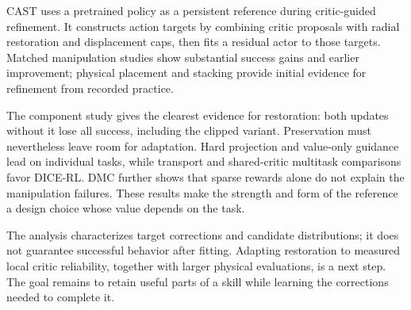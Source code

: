 CAST uses a pretrained policy as a persistent reference during critic-guided
refinement. It constructs action targets by combining critic proposals
with radial restoration and displacement caps, then fits a residual actor
to those targets. Matched manipulation studies show substantial success
gains and earlier improvement; physical placement and stacking provide
initial evidence for refinement from recorded practice.

The component study gives the clearest evidence for restoration: both
updates without it lose all success, including the clipped variant.
Preservation must nevertheless leave room for adaptation. Hard projection
and value-only guidance lead on individual tasks, while transport and
shared-critic multitask comparisons favor DICE-RL. DMC further shows that
sparse rewards alone do not explain the manipulation failures. These
results make the strength and form of the reference a design choice
whose value depends on the task.

The analysis characterizes target corrections and candidate distributions;
it does not guarantee successful behavior after fitting. Adapting
restoration to measured local critic reliability, together with larger
physical evaluations, is a next step. The goal remains to retain useful
parts of a skill while learning the corrections needed to complete it.
